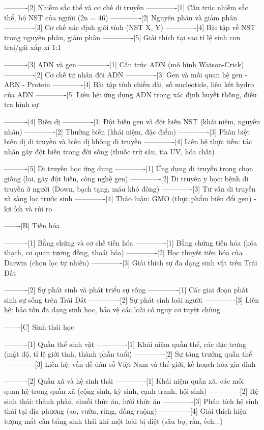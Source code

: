 ----------[2] Nhiễm sắc thể và cơ chế di truyền
-------------[1] Cấu trúc nhiễm sắc thể, bộ NST của người (2n = 46)
-------------[2] Nguyên phân và giảm phân
-------------[3] Cơ chế xác định giới tính (NST X, Y)
-------------[4] Bài tập về NST trong nguyên phân, giảm phân
-------------[5] Giải thích tại sao tỉ lệ sinh con trai/gái xấp xỉ 1:1

----------[3] ADN và gen
-------------[1] Cấu trúc ADN (mô hình Watson-Crick)
-------------[2] Cơ chế tự nhân đôi ADN
-------------[3] Gen và mối quan hệ gen - ARN - Protein
-------------[4] Bài tập tính chiều dài, số nucleotide, liên kết hydro của ADN
-------------[5] Liên hệ: ứng dụng ADN trong xác định huyết thống, điều tra hình sự

----------[4] Biến dị
-------------[1] Đột biến gen và đột biến NST (khái niệm, nguyên nhân)
-------------[2] Thường biến (khái niệm, đặc điểm)
-------------[3] Phân biệt biến dị di truyền và biến dị không di truyền
-------------[4] Liên hệ thực tiễn: tác nhân gây đột biến trong đời sống (thuốc trừ sâu, tia UV, hóa chất)

----------[5] Di truyền học ứng dụng
-------------[1] Ứng dụng di truyền trong chọn giống (lai, gây đột biến, công nghệ gen)
-------------[2] Di truyền y học: bệnh di truyền ở người (Down, bạch tạng, máu khó đông)
-------------[3] Tư vấn di truyền và sàng lọc trước sinh
-------------[4] Thảo luận: GMO (thực phẩm biến đổi gen) - lợi ích và rủi ro

-------[B] Tiến hóa

----------[1] Bằng chứng và cơ chế tiến hóa
-------------[1] Bằng chứng tiến hóa (hóa thạch, cơ quan tương đồng, thoái hóa)
-------------[2] Học thuyết tiến hóa của Darwin (chọn lọc tự nhiên)
-------------[3] Giải thích sự đa dạng sinh vật trên Trái Đất

----------[2] Sự phát sinh và phát triển sự sống
-------------[1] Các giai đoạn phát sinh sự sống trên Trái Đất
-------------[2] Sự phát sinh loài người
-------------[3] Liên hệ: bảo tồn đa dạng sinh học, bảo vệ các loài có nguy cơ tuyệt chủng

-------[C] Sinh thái học

----------[1] Quần thể sinh vật
-------------[1] Khái niệm quần thể, các đặc trưng (mật độ, tỉ lệ giới tính, thành phần tuổi)
-------------[2] Sự tăng trưởng quần thể
-------------[3] Liên hệ: vấn đề dân số Việt Nam và thế giới, kế hoạch hóa gia đình

----------[2] Quần xã và hệ sinh thái
-------------[1] Khái niệm quần xã, các mối quan hệ trong quần xã (cộng sinh, ký sinh, cạnh tranh, hội sinh)
-------------[2] Hệ sinh thái: thành phần, chuỗi thức ăn, lưới thức ăn
-------------[3] Phân tích hệ sinh thái tại địa phương (ao, vườn, rừng, đồng ruộng)
-------------[4] Giải thích hiện tượng mất cân bằng sinh thái khi một loài bị diệt (sâu bọ, rắn, ếch...)

